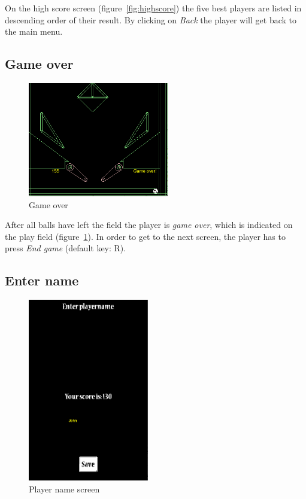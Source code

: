 \documentclass[fontsize=12pt,
               paper=a4,
               twoside=false,
               parskip=half,
               ]{scrartcl}
\begin{document}
On the high score screen (figure~\ref{fig:highscore}) the five best players are listed in descending order of their result. By clicking on \emph{Back} the player will get back to the main menu.

\subsection{Game over}

\begin{figure}[h!]
	\centering
	\includegraphics[height=5cm]{./img/manual/game_over.png}
	\caption[Game over]{Game over}
	\label{fig:game_over}
\end{figure}

After all balls have left the field the player is \emph{game over}, which is indicated on the play field (figure~\ref{fig:game_over}). In order to get to the next screen, the player has to press \emph{End game} (default key: \textsc{R}).

\subsection{Enter name}

\begin{figure}[h!]
	\centering
	\includegraphics[height=8cm]{./img/manual/playername.png}
	\caption[Player name screen]{Player name screen}
	\label{fig:playername}
\end{figure}
\end{document}
